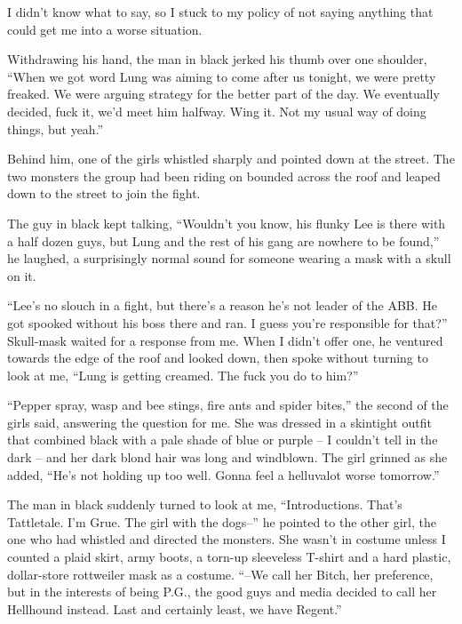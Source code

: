 I didn't know what to say, so I stuck to my policy of not saying anything that could get me into a worse situation.



Withdrawing his hand, the man in black jerked his thumb over one shoulder, ``When we got word Lung was aiming to come after us tonight, we were pretty freaked.  We were arguing strategy for the better part of the day.  We eventually decided, fuck it, we'd meet him halfway.  Wing it.  Not my usual way of doing things, but yeah.''



Behind him, one of the girls whistled sharply and pointed down at the street.  The two monsters the group had been riding on bounded across the roof and leaped down to the street to join the fight.



The guy in black kept talking, ``Wouldn't you know, his flunky Lee is there with a half dozen guys, but Lung and the rest of his gang are nowhere to be found,'' he laughed, a surprisingly normal sound for someone wearing a mask with a skull on it.



``Lee's no slouch in a fight, but there's a reason he's not leader of the ABB.  He got spooked without his boss there and ran.  I guess you're responsible for that?''  Skull-mask waited for a response from me.  When I didn't offer one, he ventured towards the edge of the roof and looked down, then spoke without turning to look at me, ``Lung is getting creamed.  The fuck you do to him?''



``Pepper spray, wasp and bee stings, fire ants and spider bites,'' the second of the girls said, answering the question for me.  She was dressed in a skintight outfit that combined black with a pale shade of blue or purple – I couldn't tell in the dark – and her dark blond hair was long and windblown.  The girl grinned as she added, ``He's not holding up too well.  Gonna feel a helluvalot worse tomorrow.''



The man in black suddenly turned to look at me, ``Introductions.  That's Tattletale.  I'm Grue.  The girl with the dogs--'' he pointed to the other girl, the one who had whistled and directed the monsters.  She wasn't in costume unless I counted a plaid skirt, army boots, a torn-up sleeveless T-shirt and a hard plastic, dollar-store rottweiler mask as a costume. ``--We call her Bitch, her preference, but in the interests of being P.G., the good guys and media decided to call her Hellhound instead.  Last and certainly least, we have Regent.''




